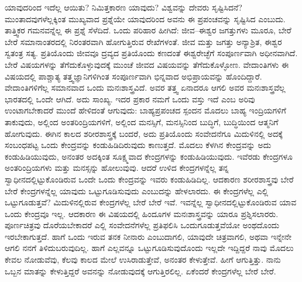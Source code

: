 ಯಾವುದರಿಂದ ಇದೆಲ್ಲ ಆಯಿತು? ನಿಮಿತ್ತಕಾರಣ ಯಾವುದು? ವಿಶ್ವವನ್ನು ದೇವರು ಸೃಷ್ಟಿಸಿದನೆ? ಮುಂತಾದವುಗಳೆಲ್ಲಕ್ಕಿಂತ ಮುಖ್ಯವಾದ ಪ್ರಶ್ನೆಯೇ ಯಾವುದರಿಂದ ಅವನು ಈ ಪ್ರಪಂಚವನ್ನು ಸೃಷ್ಟಿಸಿದ ಎಂಬುದು. ತಾತ್ತ್ವಿಕರ ಗಮನವನ್ನೆಲ್ಲ ಈ ಪ್ರಶ್ನೆ ಸೆಳೆದಿದೆ. ಒಂದು ಪರಿಹಾರ ಹೀಗಿದೆ: ಜೀವ–ಈಶ್ವರ ಜಗತ್ತುಗಳು ಮೂರೂ, ಬೇರೆ ಬೇರೆ ಸಮಾನಾಂತರದಲ್ಲಿ ನಿರಂತರವಾಗಿ ಹೋಗುತ್ತಿರುವ ರೇಖೆಗಳಂತೆ. ಜೀವ ಮತ್ತು ಜಗತ್ತು ಅನ್ಯಾಶ್ರಿತ, ಈಶ್ವರ ಸ್ವತಂತ್ರ ಸತ್ಯ. ಪ್ರತಿಯೊಂದು ಜೀವವೂ ದ್ರವ್ಯದ ಪ್ರತಿಯೊಂದು ಕಣದಂತೆ ಈಶ್ವರೇಚ್ಛೆಗೆ ಸಂಪೂರ್ಣವಾಗಿ ಅಧೀನವಾಗಿದೆ. ಬೇರೆ ವಿಷಯಗಳನ್ನು ತೆಗೆದುಕೊಳ್ಳುವುದಕ್ಕೆ ಮುಂಚೆ ಜೀವದ ವಿಷಯವನ್ನು ತೆಗೆದುಕೊಳ್ಳೋಣ. ವೇದಾಂತಿಗಳು ಈ ವಿಷಯದಲ್ಲಿ ಪಾಶ್ಚಾತ್ಯ ತತ್ತ್ವಜ್ಞಾನಿಗಳಿಗಿಂತ ಸಂಪೂರ್ಣವಾಗಿ ಭಿನ್ನವಾದ ಅಭಿಪ್ರಾಯವನ್ನು ಹೊಂದಿದ್ದಾರೆ. ವೇದಾಂತಿಗಳಿಗೆಲ್ಲ ಸಮಾನವಾದ ಒಂದು ಮನಃಶಾಸ್ತ್ರವಿದೆ. ಅವರ ತತ್ತ್ವ ಏನಾದರೂ ಆಗಲಿ ಅವರ ಮನಃಶಾಸ್ತ್ರವೆಲ್ಲ ಭಾರತದಲ್ಲಿ ಒಂದೇ ಆಗಿದೆ. ಅದು ಸಾಂಖ್ಯ. ಇದರ ಪ್ರಕಾರ ನಮಗೆ ಒಂದು ವಸ್ತು ಇದೆ ಎಂಬ ಅರಿವು ಉಂಟಾಗಬೇಕಾದರೆ ಮುಂದೆ ಹೇಳಿದಂತೆ ಆಗುವುದು: ಬಾಹ್ಯಪ್ರಪಂಚದ ಸ್ಪಂದನ ಮೊದಲು ಬಾಹ್ಯ ಇಂದ್ರಿಯಗಳಿಗೆ ತಾಕುವುದು, ಅಲ್ಲಿಂದ ಅಂತರಿಂದ್ರಿಯಗಳಿಗೆ, ಅಲ್ಲಿಂದ ಮನಸ್ಸಿಗೆ, ಮನಸ್ಸಿನಿಂದ ಬುದ್ಧಿಗೆ, ಬುದ್ಧಿಯಿಂದ ಆತ್ಮನಿಗೆ ಹೋಗುವುದು. ಈಗಿನ ಕಾಲದ ಶರೀರಶಾಸ್ತ್ರಕ್ಕೆ ಬಂದರೆ, ಅದು ಪ್ರತಿಯೊಂದು ಸಂವೇದನೆಗೂ ಮಿದುಳಿನಲ್ಲಿ ಅದಕ್ಕೆ ಸಂಬಂಧಪಟ್ಟ ಒಂದು ಕೇಂದ್ರವನ್ನು ಕಂಡುಹಿಡಿದಿರುವುದು ಕಾಣುತ್ತದೆ. ಮೊದಲು ಕೆಳಗಿನ ಕೇಂದ್ರವನ್ನು ಅದು ಕಂಡುಹಿಡಿಯುವುದು, ಅನಂತರ ಅದಕ್ಕಿಂತ ಸೂಕ್ಷ್ಮವಾದ ಕೇಂದ್ರಗಳನ್ನು ಕಂಡುಹಿಡಿಯುವುದು. ಇವೆರಡು ಕೇಂದ್ರಗಳೂ ಅಂತರಿಂದ್ರಿಯಗಳು ಮತ್ತು ಮನಸ್ಸನ್ನು ಹೋಲುವುವು. ಆದರೆ ಉಳಿದ ಕೇಂದ್ರಗಳನ್ನೆಲ್ಲ ತನ್ನ ಸ್ವಾಧೀನದಲ್ಲಿಟ್ಟುಕೊಂಡಿರುವ ಒಂದೇ ಒಂದು ಕೇಂದ್ರವನ್ನು ಇವರು ಕಂಡುಹಿಡಿದಿಲ್ಲ. ಆದಕಾರಣ ಶರೀರಶಾಸ್ತ್ರವು ಬೇರೆ ಬೇರೆ ಕೇಂದ್ರಗಳನ್ನೆಲ್ಲ ಯಾವುದು ಒಟ್ಟುಗೂಡಿಸುವುದು ಎಂಬುದನ್ನು ಹೇಳಲಾರದು. ಈ ಕೇಂದ್ರಗಳೆಲ್ಲ ಎಲ್ಲಿ ಒಟ್ಟುಗೂಡುತ್ತವೆ? ಮಿದುಳಿನಲ್ಲಿರುವ ಕೇಂದ್ರಗಳೆಲ್ಲ ಬೇರೆ ಬೇರೆ ಇವೆ. ಇವನ್ನೆಲ್ಲ ಸ್ವಾಧೀನದಲ್ಲಿಟ್ಟುಕೊಂಡಿರುವ ಯಾವ ಒಂದು ಕೇಂದ್ರವೂ ಇಲ್ಲ. ಆದಕಾರಣ ಈ ವಿಷಯದಲ್ಲಿ ಹಿಂದೂಗಳ ಮನಃಶಾಸ್ತ್ರವನ್ನು ಯಾರೂ ಪ್ರಶ್ನಿಸಲಾರರು. ಪೂರ್ಣಚಿತ್ರವು ದೊರೆಯಬೇಕಾದರೆ ಎಲ್ಲಿ ಸಂವೇದನೆಗಳೆಲ್ಲ ಪ್ರತಿಫಲಿಸಿ ಒಂದುಗೂಡುತ್ತವೆಯೋ ಅಂಥದೊಂದು ಇರಬೇಕಾಗುತ್ತದೆ. ಹಾಗೆ ಒಂದು ಇರುವ ತನಕ ನೀನಾರು ಎಂಬುದಾಗಲಿ, ಯಾವುದೇ ಚಿತ್ರವಾಗಲಿ, ಅಥವಾ ಇನ್ನೇನೇ ಆಗಲಿ ನನಗೆ ತಿಳಿದುಬರುವುದಿಲ್ಲ. ಹಾಗೆ ಎಲ್ಲವನ್ನೂ ಒಟ್ಟುಗೂಡಿಸುವುದೊಂದು ಇಲ್ಲದೇ ಇದ್ದಿದ್ದರೆ ನಾವು ಮೊದಲು ಕೇವಲ ನೋಡುವೆವು, ಕೆಲವು ಕಾಲದ ಮೇಲೆ ಉಸಿರಾಡುತ್ತೇವೆ, ಅನಂತರ ಕೇಳುತ್ತೇವೆ. ಹೀಗೆ ಆಗುತ್ತಿತ್ತು. ನಾನು ಒಬ್ಬನ ಮಾತನ್ನು ಕೇಳುತ್ತಿದ್ದರೆ ಅವನನ್ನು ನೋಡುವುದಕ್ಕೆ ಆಗುತ್ತಿರಲಿಲ್ಲ. ಏಕೆಂದರೆ ಕೇಂದ್ರಗಳೆಲ್ಲ ಬೇರೆ ಬೇರೆ.

